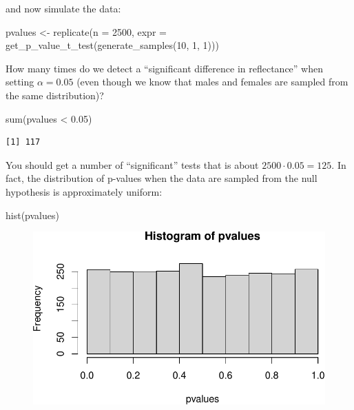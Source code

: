 \documentclass[
  letterpaper,
  DIV=11,
  numbers=noendperiod]{scrreprt}
\newenvironment{Shaded}{\begin{snugshade}}{\end{snugshade}}
\newcommand{\AttributeTok}[1]{\textcolor[rgb]{0.40,0.45,0.13}{#1}}
\newcommand{\DecValTok}[1]{\textcolor[rgb]{0.68,0.00,0.00}{#1}}
\newcommand{\FloatTok}[1]{\textcolor[rgb]{0.68,0.00,0.00}{#1}}
\newcommand{\FunctionTok}[1]{\textcolor[rgb]{0.28,0.35,0.67}{#1}}
\newcommand{\NormalTok}[1]{\textcolor[rgb]{0.00,0.23,0.31}{#1}}
\newcommand{\OtherTok}[1]{\textcolor[rgb]{0.00,0.23,0.31}{#1}}
\newcommand{\SpecialCharTok}[1]{\textcolor[rgb]{0.37,0.37,0.37}{#1}}
\begin{document}
and now simulate the data:

\begin{Shaded}
\begin{Highlighting}[]
\NormalTok{pvalues }\OtherTok{\textless{}{-}} \FunctionTok{replicate}\NormalTok{(}\AttributeTok{n =} \DecValTok{2500}\NormalTok{, }
                     \AttributeTok{expr =} \FunctionTok{get\_p\_value\_t\_test}\NormalTok{(}\FunctionTok{generate\_samples}\NormalTok{(}\DecValTok{10}\NormalTok{, }\DecValTok{1}\NormalTok{, }\DecValTok{1}\NormalTok{)))}
\end{Highlighting}
\end{Shaded}

How many times do we detect a ``significant difference in reflectance''
when setting \(\alpha = 0.05\) (even though we know that males and
females are sampled from the same distribution)?

\begin{Shaded}
\begin{Highlighting}[]
\FunctionTok{sum}\NormalTok{(pvalues }\SpecialCharTok{\textless{}} \FloatTok{0.05}\NormalTok{)}
\end{Highlighting}
\end{Shaded}

\begin{verbatim}
[1] 117
\end{verbatim}

You should get a number of ``significant'' tests that is about
\(2500 \cdot 0.05 = 125\). In fact, the distribution of p-values when
the data are sampled from the null hypothesis is approximately uniform:

\begin{Shaded}
\begin{Highlighting}[]
\FunctionTok{hist}\NormalTok{(pvalues)}
\end{Highlighting}
\end{Shaded}

\begin{figure}[H]

{\centering \includegraphics{./05-hypothesis_files/figure-pdf/unnamed-chunk-8-1.pdf}

}

\end{figure}
\end{document}
